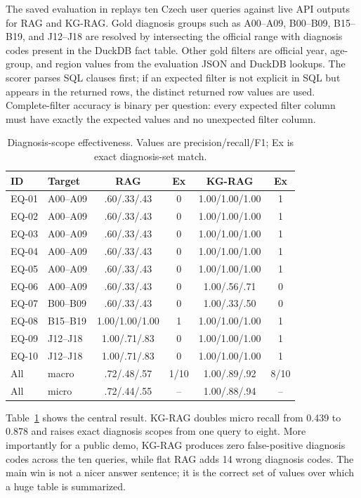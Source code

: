 \documentclass[
]{ceurart}
\newcommand{\code}[1]{\texttt{\detokenize{#1}}}
\begin{document}
The saved evaluation in \code{dg_evaluation} replays ten Czech user queries
against live API outputs for RAG and KG-RAG. Gold diagnosis groups such as
A00--A09, B00--B09, B15--B19, and J12--J18 are resolved by intersecting the
official range with diagnosis codes present in the DuckDB fact table. Other
gold filters are official year, age-group, and region values from the
evaluation JSON and DuckDB lookups. The scorer parses SQL \code{WHERE}
clauses first; if an expected filter is not explicit in SQL but appears in the
returned rows, the distinct returned row values are used. Complete-filter
accuracy is binary per question: every expected filter column must have
exactly the expected values and no unexpected filter column.

\begin{table}[h]
\caption{Diagnosis-scope effectiveness. Values are precision/recall/F1; Ex is exact diagnosis-set match.}
\label{tab:diagnosis-results}
\scriptsize
\begin{tabularx}{\linewidth}{llcccc}
\toprule
ID & Target & RAG & Ex & KG-RAG & Ex \\
\midrule
EQ-01 & A00--A09 & .60/.33/.43 & 0 & 1.00/1.00/1.00 & 1 \\
EQ-02 & A00--A09 & .60/.33/.43 & 0 & 1.00/1.00/1.00 & 1 \\
EQ-03 & A00--A09 & .60/.33/.43 & 0 & 1.00/1.00/1.00 & 1 \\
EQ-04 & A00--A09 & .60/.33/.43 & 0 & 1.00/1.00/1.00 & 1 \\
EQ-05 & A00--A09 & .60/.33/.43 & 0 & 1.00/1.00/1.00 & 1 \\
EQ-06 & A00--A09 & .60/.33/.43 & 0 & 1.00/.56/.71 & 0 \\
EQ-07 & B00--B09 & .60/.33/.43 & 0 & 1.00/.33/.50 & 0 \\
EQ-08 & B15--B19 & 1.00/1.00/1.00 & 1 & 1.00/1.00/1.00 & 1 \\
EQ-09 & J12--J18 & 1.00/.71/.83 & 0 & 1.00/1.00/1.00 & 1 \\
EQ-10 & J12--J18 & 1.00/.71/.83 & 0 & 1.00/1.00/1.00 & 1 \\
\midrule
All & macro & .72/.48/.57 & 1/10 & 1.00/.89/.92 & 8/10 \\
All & micro & .72/.44/.55 & -- & 1.00/.88/.94 & -- \\
\bottomrule
\end{tabularx}
\end{table}

Table~\ref{tab:diagnosis-results} shows the central result. KG-RAG doubles
micro recall from 0.439 to 0.878 and raises exact diagnosis scopes from one
query to eight. More importantly for a public demo, KG-RAG produces zero
false-positive diagnosis codes across the ten queries, while flat RAG adds 14
wrong diagnosis codes. The main win is not a nicer answer sentence; it is the
correct set of values over which a huge table is summarized.
\end{document}
